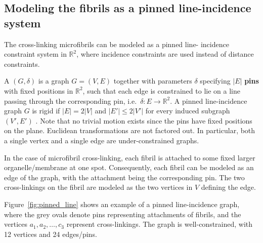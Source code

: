 \subsection{Modeling the fibrils as a pinned line-incidence system}



The cross-linking microfibrils can be modeled as a pinned line-
incidence constraint system in $\mathbb{R}^2$, where incidence
constraints are used instead of distance constraints.

A  $(G,\delta)$ is a graph $G=(V,E)$
together with parameters $\delta$ specifying $|E|$ \textbf{pins} with
fixed positions in $\mathbb{R}^2$, such that each edge is constrained
to lie on a line passing through the corresponding pin, i.e.\ $\delta:
E \rightarrow \mathbb{R}^2$.
%
%
A pinned line-incidence graph $G$ is rigid if $|E| = 2|V|$ and $|E'| \le 2|V'|$ for every induced subgraph $(V',E')$ \cite{sitharam2014incidence}. Note that no trivial motion exists since the pins have fixed positions on the plane.
Euclidean transformations are not factored out.
In particular, both a single vertex and a single edge are under-constrained graphs.




In the case of microfibril cross-linking, each fibril is
attached to some fixed larger organelle/membrane at one spot.
Consequently, each fibril can be modeled as an edge of the graph,
with the attachment being the corresponding pin.
The two cross-linkings on the fibril are modeled as the two vertices in $V$ defining the edge.



Figure~\ref{fig:pinned_line} shows an example of a pinned line-incidence graph,
where the grey ovals denote pins representing attachments of fibrils,
and the vertices $a_1,a_2,\ldots, c_3$ represent cross-linkings.
The graph is well-constrained, with 12 vertices and 24 edges/pins.

